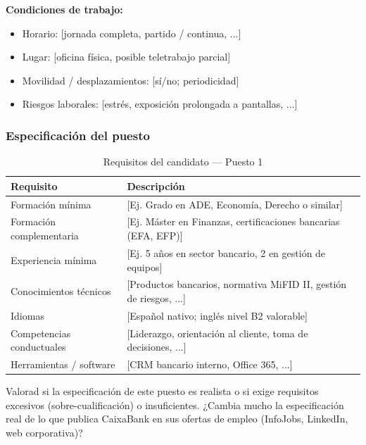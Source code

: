 \textbf{Condiciones de trabajo:}
\begin{itemize}
  \item Horario: [jornada completa, partido / continua, ...]
  \item Lugar: [oficina física, posible teletrabajo parcial]
  \item Movilidad / desplazamientos: [sí/no; periodicidad]
  \item Riesgos laborales: [estrés, exposición prolongada a pantallas, ...]
\end{itemize}

\subsubsection{Especificación del puesto}

\begin{table}[H]
  \centering
  \small
  \caption{Requisitos del candidato — Puesto 1}
  \begin{tabularx}{\textwidth}{lX}
    \toprule
    \textbf{Requisito}       & \textbf{Descripción} \\
    \midrule
    Formación mínima         & [Ej. Grado en ADE, Economía, Derecho o similar] \\
    Formación complementaria & [Ej. Máster en Finanzas, certificaciones bancarias (EFA, EFP)] \\
    Experiencia mínima       & [Ej. 5 años en sector bancario, 2 en gestión de equipos] \\
    Conocimientos técnicos   & [Productos bancarios, normativa MiFID II, gestión de riesgos, ...] \\
    Idiomas                  & [Español nativo; inglés nivel B2 valorable] \\
    Competencias conductuales & [Liderazgo, orientación al cliente, toma de decisiones, ...] \\
    Herramientas / software  & [CRM bancario interno, Office 365, ...] \\
    \bottomrule
  \end{tabularx}
\end{table}

\begin{notaequipo}
  Valorad si la especificación de este puesto es realista o si exige
  requisitos excesivos (sobre-cualificación) o insuficientes. ¿Cambia mucho
  la especificación real de lo que publica CaixaBank en sus ofertas de
  empleo (InfoJobs, LinkedIn, web corporativa)?
\end{notaequipo}


